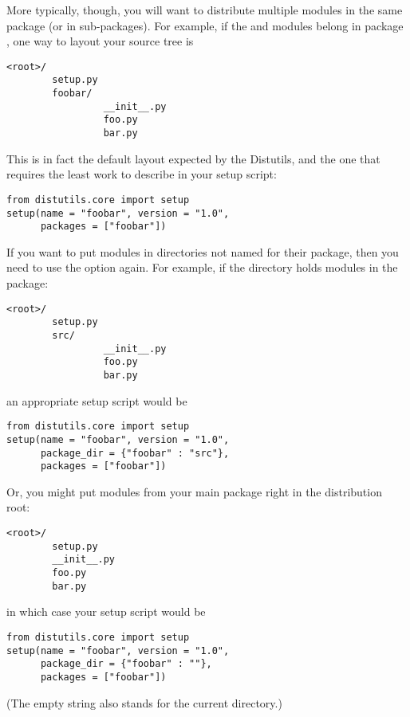 \documentclass{howto}
\begin{document}
More typically, though, you will want to distribute multiple modules in
the same package (or in sub-packages).  For example, if the  
and  modules belong in package , one way to
layout your source tree is
\begin{verbatim}
<root>/
        setup.py
        foobar/
                 __init__.py
                 foo.py
                 bar.py
\end{verbatim}
This is in fact the default layout expected by the Distutils, and the
one that requires the least work to describe in your setup script:
\begin{verbatim}
from distutils.core import setup
setup(name = "foobar", version = "1.0",
      packages = ["foobar"])
\end{verbatim}

If you want to put modules in directories not named for their package,
then you need to use the  option again.  For
example, if the  directory holds modules in the
 package:
\begin{verbatim}
<root>/
        setup.py
        src/
                 __init__.py
                 foo.py
                 bar.py
\end{verbatim}
an appropriate setup script would be
\begin{verbatim}
from distutils.core import setup
setup(name = "foobar", version = "1.0",
      package_dir = {"foobar" : "src"},
      packages = ["foobar"])
\end{verbatim}

Or, you might put modules from your main package right in the
distribution root:
\begin{verbatim}
<root>/
        setup.py
        __init__.py
        foo.py
        bar.py
\end{verbatim}
in which case your setup script would be
\begin{verbatim}
from distutils.core import setup
setup(name = "foobar", version = "1.0",
      package_dir = {"foobar" : ""},
      packages = ["foobar"])
\end{verbatim}
(The empty string also stands for the current directory.)
\end{document}
